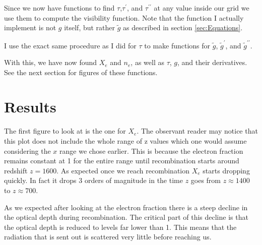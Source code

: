 \documentclass{aa}   %
\begin{document}
Since we now have functions to find $\tau$,$\tau^\prime$, and $\tau^{\prime\prime}$ at any value inside our grid we use them to compute the visibility function. Note that the function I actually implement is not $g$ itself, but rather $\tilde{g}$ as described in section \ref{sec:Equations}.

I use the exact same procedure as I did for $\tau$ to make functions for $\tilde{g}$, $\tilde{g}^\prime$, and $\tilde{g}^{\prime\prime}$.

With this, we have now found $X_e$ and $n_e$, as well as  $\tau$, $g$, and their derivatives. See the next section for figures of these functions.
\section{Results}\label{sec:results}

The first figure to look at is the one for $X_e$. The observant reader may notice that this plot does not include the whole range of z values which one would assume considering the $x$ range we chose earlier. This is because the electron fraction remains constant at 1 for the entire range until recombination starts around redshift $z = 1600$. As expected once we reach recombination $X_e$ starts dropping quickly. In fact it drops 3 orders of magnitude in the time $z$ goes from $z \approx 1400$ to $z \approx 700$.


As we expected after looking at the electron fraction there is a steep decline in the optical depth during recombination.
The critical part of this decline is that the optical depth is reduced to levels far lower than 1. This means that the radiation that is sent out is scattered very little before reaching us.


 
\end{document}
